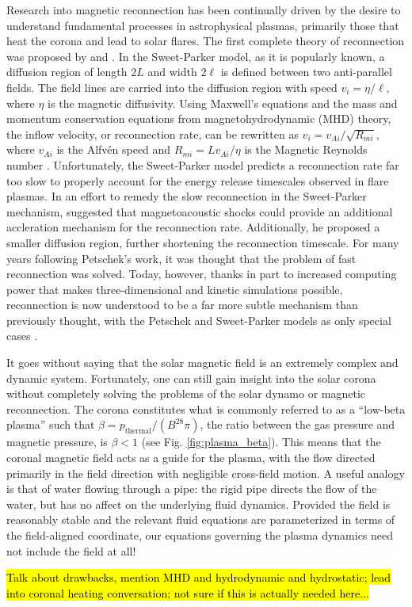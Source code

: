 \par Research into magnetic reconnection has been continually driven by the desire to understand fundamental processes in astrophysical plasmas, primarily those that heat the corona and lead to solar flares. The first complete theory of reconnection was proposed by \citet{sweet_neutral_1958} and \citet{parker_sweets_1957,parker_solar-flare_1963}. In the Sweet-Parker model, as it is popularly known, a diffusion region of length $2L$ and width $2\ell$ is defined between two anti-parallel fields. The field lines are carried into the diffusion region with speed $v_i=\eta/\ell$, where $\eta$ is the magnetic diffusivity. Using Maxwell's equations and the mass and momentum conservation equations from magnetohydrodynamic (MHD) theory, the inflow velocity, or reconnection rate, can be rewritten as $v_i=v_{Ai}/\sqrt{R_{mi}}$, where $v_{Ai}$ is the Alfv\'{e}n speed and $R_{mi}=Lv_{Ai}/\eta$ is the Magnetic Reynolds number \citep{priest_magnetic_2000}. Unfortunately, the Sweet-Parker model predicts a reconnection rate far too slow to properly account for the energy release timescales observed in flare plasmas. In an effort to remedy the slow reconnection in the Sweet-Parker mechanism, \citet{petschek_magnetic_1964} suggested that magnetoacoustic shocks could provide an additional accleration mechanism for the reconnection rate. Additionally, he proposed a smaller diffusion region, further shortening the reconnection timescale. For many years following Petschek's work, it was thought that the problem of fast reconnection was solved. Today, however, thanks in part to increased computing power that makes three-dimensional and kinetic simulations possible, reconnection is now understood to be a far more subtle mechanism than previously thought, with the Petschek and Sweet-Parker models as only special cases \citep{priest_magnetic_2000}.
%
\par It goes without saying that the solar magnetic field is an extremely complex and dynamic system. Fortunately, one can still gain insight into the solar corona without completely solving the problems of the solar dynamo or magnetic reconnection. The corona constitutes what is commonly referred to as a ``low-beta plasma'' such that $\beta=p_{\mathrm{thermal}}/(B^28\pi)$, the ratio between the gas pressure and magnetic pressure, is $\beta<1$ (see Fig. \ref{fig:plasma_beta}). This means that the coronal magnetic field acts as a guide for the plasma, with the flow directed primarily in the field direction with negligible cross-field motion. A useful analogy is that of water flowing through a pipe: the rigid pipe directs the flow of the water, but has no affect on the underlying fluid dynamics. Provided the field is reasonably stable and the relevant fluid equations are parameterized in terms of the field-aligned coordinate, our equations governing the plasma dynamics need not include the field at all!
%
\par \hl{Talk about drawbacks, mention MHD and hydrodynamic and hydrostatic; lead into coronal heating conversation; not sure if this is actually needed here...}
